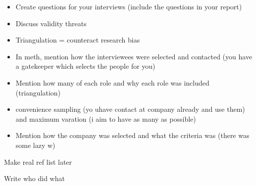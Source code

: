 \documentclass[times, 10pt,twocolumn]{IEEEtran}
\begin{document}







\begin{itemize}
\item Create questions for your interviews (include the questions in your report)
\item Discuss validity threats
\item Triangulation = counteract research bias
\item In meth, mention how the interviewees were selected and contacted (you have a gatekeeper which selects the people for you)
\item Mention how many of each role and why each role was included (triangulation)
\item convenience sampling (yo uhave contact at company already and use them) and maximum varation (i aim to have as many as possible)
\item Mention how the company was selected and what the criteria was (there was some lazy w)
\end{itemize}

Make real ref list later


Write who did what
\end{document}
